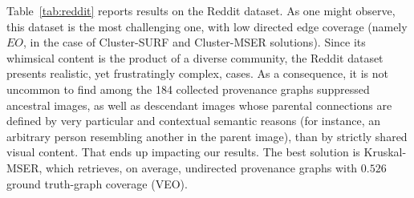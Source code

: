 Table~\ref{tab:reddit} reports results on the Reddit dataset.
As one might observe, this dataset is the most challenging one, with low directed edge coverage (namely $EO$, in the case of Cluster-SURF and Cluster-MSER solutions).
Since its whimsical content is the product of a diverse community, the Reddit dataset presents realistic, yet frustratingly complex, cases.
As a consequence, it is not uncommon to find among the 184 collected provenance graphs suppressed ancestral images, as well as descendant images whose parental connections are defined by very particular and contextual semantic reasons (for instance, an arbitrary person resembling another in the parent image), than by strictly shared visual content.
That ends up impacting our results.
The best solution is Kruskal-MSER, which retrieves, on average, undirected provenance graphs with $0.526$  ground truth-graph coverage (VEO).



